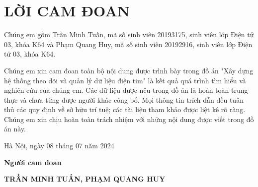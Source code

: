 \section*{LỜI CAM ĐOAN} %
\thispagestyle{empty}

Chúng em gồm Trần Minh Tuấn, mã số sinh viên 20193175, sinh viên lớp Điện tử 03, khóa K64 và Phạm Quang Huy, mã số sinh viên 20192916, sinh viên lớp Điện tử 03, khóa K64.

Chúng em xin cam đoan toàn bộ nội dung được trình bày trong đồ án "Xây dựng hệ thống theo dõi và quản lý dữ liệu điện tim" là kết quả quá trình tìm hiểu và
nghiên cứu của chúng em. Các dữ liệu được nêu trong đồ án là hoàn toàn trung thực
và chưa từng được người khác công bố. Mọi thông tin trích dẫn đều tuân thủ các quy
định về sở hữu trí tuệ; các tài liệu tham khảo được liệt kê rõ ràng. Chúng em xin
chịu hoàn toàn trách nhiệm với những nội dung được viết trong đồ án này.


\vspace{6pt}

\hspace{8cm}Hà Nội, ngày 08 tháng 07 năm 2024

\hspace{9cm}\textbf{Người cam đoan}

\vspace{1cm}
\hspace{7cm}\textbf{TRẦN MINH TUẤN,  PHẠM QUANG HUY}

\cleardoublepage